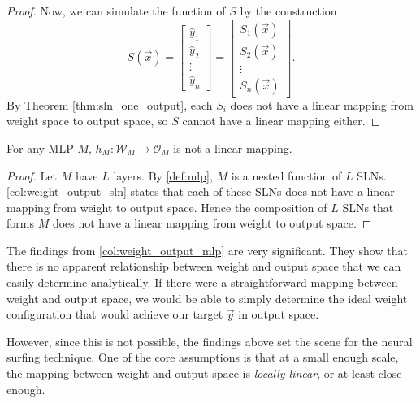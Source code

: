 \begin{proof}
    Now, we can simulate the function of $S$ by the construction
    \begin{equation*}
        S(\vec{x})
        = \begin{bmatrix}
            \hat{y}_1 \\
            \hat{y}_2 \\
            \vdots \\
            \hat{y}_n
        \end{bmatrix}
        = \begin{bmatrix}
            S_1(\vec{x}) \\
            S_2(\vec{x}) \\
            \vdots \\
            S_n(\vec{x})
        \end{bmatrix}.
    \end{equation*}
    By Theorem \ref{thm:sln_one_output}, each $S_i$ does not have a linear mapping from weight space to output space, so $S$ cannot have a linear mapping either.
\end{proof}

\begin{corollary}
    \label{col:weight_output_mlp}
    For any MLP $M$, $h_M: \mathcal{W}_M \rightarrow \mathcal{O}_M$ is not a linear mapping.
\end{corollary}
\begin{proof}
    Let $M$ have $L$ layers.
    By \ref{def:mlp}, $M$ is a nested function of $L$ SLNs. 
    \ref{col:weight_output_sln} states that each of these SLNs does not have a linear mapping from weight to output space.
    Hence the composition of $L$ SLNs that forms $M$ does not have a linear mapping from weight to output space.
\end{proof}

\begin{remark}
    The findings from \ref{col:weight_output_mlp} are very significant.
    They show that there is no apparent relationship between weight and output space that we can easily determine analytically. 
    If there were a straightforward mapping between weight and output space, we would be able to simply determine the ideal weight configuration that would achieve our target $\vec{y}$ in output space. 
    
    However, since this is not possible, the findings above set the scene for the neural surfing technique. 
    One of the core assumptions is that at a small enough scale, the mapping between weight and output space is \textit{locally linear}, or at least close enough.
\end{remark}

